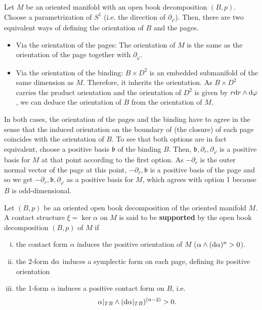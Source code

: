 \begin{remark}
    Let $M$ be an oriented manifold with an open book decomposition $(B,p)$.
    Choose a parametrization of $S^1$ (i.e. the direction of $\partial_\varphi$).
    Then, there are two equivalent ways of defining the orientation of $B$ and the pages.
    \begin{itemize}
        \item Via the orientation of the pages: The orientation of $M$ is the same as the orientation of the page together with $\partial_\varphi$.
        \item Via the orientation of the binding: $B \times D^2$ is an embedded submanifold of the same dimension as $M$. Therefore, it inherits the orientation. As $B \times D^2$ carries the product orientation and the orientation of $D^2$ is given by $r \mathrm{d} r \wedge \mathrm{d} \varphi$, we can deduce the orientation of $B$ from the orientation of $M$.
    \end{itemize}
    In both cases, the orientation of the pages and the binding have to agree in the sense that the induced orientation on the boundary of (the closure) of each page coincides with the orientation of $B$.
    To see that both options are in fact equivalent, choose a positive basis $\mathfrak{b}$ of the binding $B$. Then, $\mathfrak{b}, \partial_r, \partial_\varphi$ is a positive basis for $M$ at that point according to the first option.
    As $- \partial_r$ is the outer normal vector of the page at this point, $-\partial_r, \mathfrak{b}$ is a positive basis of the page and so we get $-\partial_r, \mathfrak{b}, \partial_\varphi$ as a positive basis for $M$, which agrees with option 1 because $B$ is odd-dimensional.
\end{remark}

\begin{definition}\label{def:support}
    Let $(B,p)$ be an oriented open book decomposition of the oriented manifold $M$.
    A contact structure $\xi = \ker \alpha$ on $M$ is said to be \textbf{supported} by the open book decomposition $(B,p)$ of $M$ if
    \begin{enumerate}[(i)]
        \item the contact form $\alpha$ induces the positive orientation of $M$ ($\alpha \wedge (\mathrm{d} \alpha)^n > 0$).
        \item the 2-form $\mathrm{d} \alpha$ induces a symplectic form on each page, defining its positive orientation
        \item the 1-form $\alpha$ induces a positive contact form on $B$, i.e. 
        \[ 
            \alpha|_{TB} \wedge (\mathrm{d} \alpha|_{TB})^{(n-2)} > 0.
        \]
    \end{enumerate}
\end{definition}

